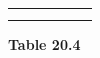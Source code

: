 {{\begin{center}
\begin{tabular}[t]{|l|l|l|l|l|l|}
    
         &
    
    
         &
    
    
     \tabularnewline\cline{1-1}\cline{2-2}\cline{3-3}\cline{4-4}\cline{5-5}\cline{6-6}
    
    
         &
    
    
         &
    
    
         &
    
    
         &
    
    
         &
    
    
     \tabularnewline\cline{1-1}\cline{2-2}\cline{3-3}\cline{4-4}\cline{5-5}\cline{6-6}
    \end{tabular}
      \end{center}
    \begin{center}{\small\bfseries Table 20.4}\end{center}
    
}}
